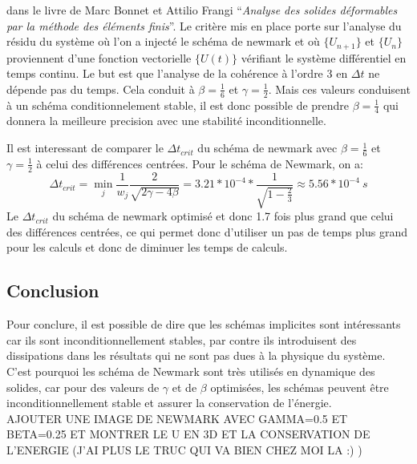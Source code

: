 \documentclass[]{article}
\begin{document}
dans le livre de Marc Bonnet et Attilio Frangi ``\textit{Analyse des solides
déformables par la méthode des éléments finis}''. Le critère mis en place porte
sur l'analyse du résidu du système où l'on a injecté le schéma de newmark et où
$\{U_{n+1}\}$ et $\{U_{n}\}$ proviennent d'une fonction vectorielle $\{U(t)\}$
vérifiant le système différentiel en temps continu. Le but est que l'analyse de
la cohérence à l'ordre 3 en $\Delta t$ ne dépende pas du temps. Cela conduit à
$\beta = \frac{1}{6}$ et $\gamma=\frac{1}{2}$. Mais ces valeurs conduisent à un
schéma conditionnelement stable, il est donc possible de prendre $\beta =
\frac{1}{4}$ qui donnera la meilleure precision avec une stabilité
inconditionnelle.

Il est interessant de comparer le $\Delta t_{crit}$ du schéma de newmark avec
$\beta = \frac{1}{6}$ et $\gamma=\frac{1}{2}$ à celui des différences centrées.
Pour le schéma de Newmark, on a:
$$
\Delta t_{crit} = \min_{j} \frac{1}{w_{j}} \frac{2}{\sqrt{2\gamma - 4\beta}} =
3.21*10^{-4}*\frac{1}{\sqrt{1 - \frac{2}{3}}} \approx 5.56*10^{-4}\ s
$$
Le $\Delta t_{crit}$ du schéma de newmark optimisé et donc 1.7 fois plus grand
que celui des différences centrées, ce qui permet donc d'utiliser un pas de
temps plus grand pour les calculs et donc de diminuer les temps de calculs.

\subsection{Conclusion}

Pour conclure, il est possible de dire que les schémas implicites sont
intéressants car ils sont inconditionnellement stables, par contre ils
introduisent des dissipations dans les résultats qui ne sont pas dues à la
physique du système. C'est pourquoi les schéma de Newmark sont très utilisés en
dynamique des solides, car pour des valeurs de $\gamma$ et de $\beta$
optimisées, les schémas peuvent être inconditionnellement stable et assurer la
conservation de l'énergie.\\

AJOUTER UNE IMAGE DE NEWMARK AVEC GAMMA=0.5 ET BETA=0.25 ET MONTRER LE U EN 3D
ET LA CONSERVATION DE L'ENERGIE (J'AI PLUS LE TRUC QUI VA BIEN CHEZ MOI LA :) )
\end{document}
